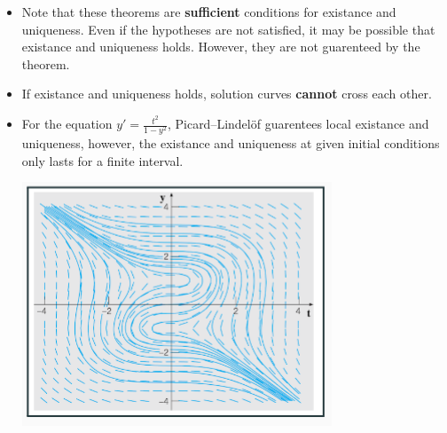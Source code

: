 \documentclass[a4paper, 10pt]{article}
\numberwithin{equation}{section}
\begin{document}
\begin{itemize}
\begin{theorem}
        \vspace{10pt}
        \textbf{Remarks:}
        \begin{enumerate}
            \item Non-linear ODEs don't necessarily have a general solution.
            \item The solution might be implicit. e.g. $\sqrt{y^2+\log y}=5t$
        \end{enumerate}

        \vspace{10pt}
        \textbf{Clarifications:}
        \begin{itemize}
            \item We need $f$ continuous in the rectangle to get existance.
            \item We need $\partialderivative{f}{y}$ continuous in the rectangle to get uniqueness.
        \end{itemize}
        \begin{proof}
            The proof for this theorem is beyond the scope of this class.
        \end{proof}
    \end{theorem}
    \item Note that these theorems are \textbf{sufficient} conditions for existance and uniqueness. Even if the hypotheses are not satisfied, it may be possible that existance and uniqueness holds.  However, they are not guarenteed by the theorem. 
    \item If existance and uniqueness holds, solution curves \textbf{cannot} cross each other. 
    \item For the equation $y'=\frac{t^2}{1-y^2}$, Picard–Lindelöf guarentees local existance and uniqueness, however, the existance and uniqueness at given initial conditions only lasts for a finite interval. 
    \begin{center}
        \includegraphics{mat292/fig2.png}
    \end{center}
\end{itemize}
\end{document}
